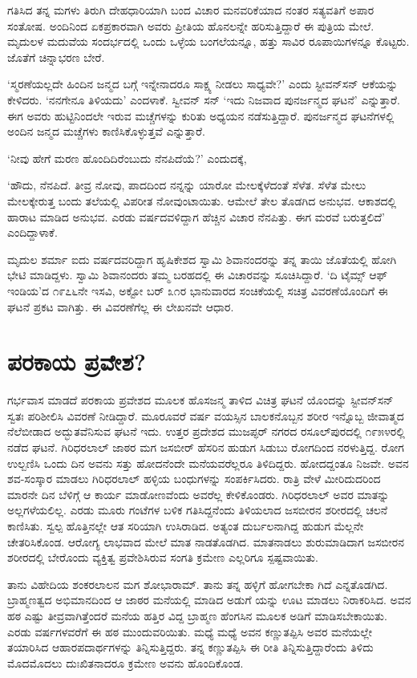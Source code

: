 ಗತಿಸಿದ ತನ್ನ ಮಗಳು ತಿರುಗಿ ದೇಹಧಾರಿಯಾಗಿ ಬಂದ ವಿಚಾರ ಮನವರಿಕೆಯಾದ ನಂತರ ಸತ್ಯವತಿಗೆ ಅಪಾರ ಸಂತೋಷ. ಅಂದಿನಿಂದ ಏಕಪ್ರಕಾರವಾಗಿ ಅವರು ಪ್ರೀತಿಯ ಹೊನಲನ್ನೇ ಹರಿಸುತ್ತಿದ್ದಾರೆ ಈ ಪುತ್ರಿಯ ಮೇಲೆ. ಮೃದುಲಳ ಮದುವೆಯ ಸಂದರ್ಭದಲ್ಲಿ ಒಂದು ಒಳ್ಳೆಯ ಬಂಗಲೆಯನ್ನೂ, ಹತ್ತು ಸಾವಿರ ರೂಪಾಯಿಗಳನ್ನೂ ಕೊಟ್ಟರು. ಜೊತೆಗೆ ಚಿನ್ನಾಭರಣ ಬೇರೆ.

‘ಸ್ಮರಣೆಯಲ್ಲದೇ ಹಿಂದಿನ ಜನ್ಮದ ಬಗ್ಗೆ ಇನ್ನೇನಾದರೂ ಸಾಕ್ಷ್ಯ ನೀಡಲು ಸಾಧ್ಯವೇ?’ ಎಂದು ಸ್ಟೀವನ್​ಸನ್ ಆಕೆಯನ್ನು ಕೇಳಿದರು. ‘ನನಗೇನೂ ತಿಳಿಯದು’ ಎಂದಳಾಕೆ. ಸ್ವೀವನ್ ಸನ್ ‘ಇದು ನಿಜವಾದ ಪುನರ್ಜನ್ಮದ ಘಟನೆ’ ಎನ್ನುತ್ತಾರೆ. ಈಗ ಅವರು ಹುಟ್ಟಿನಿಂದಲೇ ಇರುವ ಮಚ್ಚೆಗಳನ್ನು ಕುರಿತು ಅಧ್ಯಯನ ನಡೆಸುತ್ತಿದ್ದಾರೆ. ಪುನರ್ಜನ್ಮದ ಘಟನೆಗಳಲ್ಲಿ ಅಂದಿನ ಜನ್ಮದ ಮಚ್ಚೆಗಳು ಕಾಣಿಸಿಕೊಳ್ಳುತ್ತವೆ ಎನ್ನುತ್ತಾರೆ.

‘ನೀವು ಹೇಗೆ ಮರಣ ಹೊಂದಿದಿರೆಂಬುದು ನೆನಪಿದೆಯೆ?’ ಎಂದುದಕ್ಕೆ,

‘ಹೌದು, ನೆನಪಿದೆ. ತೀವ್ರ ನೋವು, ಪಾದದಿಂದ ನನ್ನನ್ನು ಯಾರೋ ಮೇಲಕ್ಕೆಳೆದಂತೆ ಸೆಳೆತ. ಸೆಳೆತ ಮೇಲು ಮೇಲಕ್ಕೇರುತ್ತ ಬಂದು ತಲೆಯಲ್ಲಿ ವಿಪರೀತ ನೋವುಂಟಾಯಿತು. ಆಮೇಲೆ ತೇಲ ತೊಡಗಿದ ಅನುಭವ. ಆಕಾಶದಲ್ಲಿ ಹಾರಾಟ ಮಾಡಿದ ಅನುಭವ. ಎರಡು ವರ್ಷದವಳಿದ್ದಾಗ ಹೆಚ್ಚಿನ ವಿಚಾರ ನೆನಪಿತ್ತು. ಈಗ ಮರವೆ ಬರುತ್ತಲಿದೆ’ ಎಂದಿದ್ದಾಳಾಕೆ.

ಮೃದುಲ ಶರ್ಮಾ ಐದು ವರ್ಷದವರಿದ್ದಾಗ ಹೃಷಿಕೇಶದ ಸ್ವಾಮಿ ಶಿವಾನಂದರನ್ನು ತನ್ನ ತಾಯಿ ಜೊತೆಯಲ್ಲಿ ಹೋಗಿ ಭೇಟಿ ಮಾಡಿದ್ದಳು. ಸ್ವಾಮಿ ಶಿವಾನಂದರು ತಮ್ಮ ಬರಹದಲ್ಲಿ ಈ ವಿಚಾರವನ್ನು ಸೂಚಿಸಿದ್ದಾರೆ. ‘ದಿ ಟೈಮ್ಸ್ ಆಫ್ ಇಂಡಿಯ’ದ ೧೯೭೬ನೇ ಇಸವಿ, ಅಕ್ಟೋ ಬರ್ ೩೧ರ ಭಾನುವಾರದ ಸಂಚಿಕೆಯಲ್ಲಿ ಸಚಿತ್ರ ವಿವರಣೆಯೊಂದಿಗೆ ಈ ಘಟನೆ ಪ್ರಕಟ ವಾಗಿತ್ತು. ಈ ವಿವರಣೆಗೆಲ್ಲ ಈ ಲೇಖನವೇ ಆಧಾರ.


\section{ಪರಕಾಯ ಪ್ರವೇಶ?}

ಗರ್ಭವಾಸ ಮಾಡದೆ ಪರಕಾಯ ಪ್ರವೇಶದ ಮೂಲಕ ಹೊಸಜನ್ಮ ತಾಳಿದ ವಿಚಿತ್ರ ಘಟನೆ ಯೊಂದನ್ನು ಸ್ಟೀವನ್​ಸನ್ ಸ್ವತಃ ಪರಿಶೀಲಿಸಿ ವಿವರಣೆ ನೀಡಿದ್ದಾರೆ. ಮೂರೂವರೆ ವರ್ಷ ವಯಸ್ಸಿನ ಬಾಲಕನೊಬ್ಬನ ಶರೀರ ಇನ್ನೊಬ್ಬ ಜೀವಾತ್ಮದ ನೆಲೆಬೀಡಾದ ಅದ್ಭುತವೆನಿಸುವ ಘಟನೆ ಇದು. ಉತ್ತರ ಪ್ರದೇಶದ ಮುಜಪ್ಫರ್ ನಗರದ ರಸೂಲ್​ಪುರದಲ್ಲಿ ೧೯೫೪ರಲ್ಲಿ ನಡೆದ ಘಟನೆ. ಗಿರಿಧರಲಾಲ್ ಜಾಠರ ಮಗ ಜಸಬೀರ್ ಹೆಸರಿನ ಹುಡುಗ ಸಿಡುಬು ರೋಗದಿಂದ ನರಳುತ್ತಿದ್ದ. ರೋಗ ಉಲ್ಬಣಿಸಿ ಒಂದು ದಿನ ಅವನು ಸತ್ತು ಹೋದನೆಂದೇ ಮನೆಯವರೆಲ್ಲರೂ ತಿಳಿದಿದ್ದರು. ಹೋದದ್ದಂತೂ ನಿಜವೇ. ಅವನ ಶವ-ಸಂಸ್ಕಾರ ಮಾಡಲು ಗಿರಿಧರಲಾಲ್ ಹಳ್ಳಿಯ ಬಂಧುಗಳನ್ನು ಸಂಪರ್ಕಿಸಿದರು. ರಾತ್ರಿ ವೇಳೆ ಮೀರಿದುದರಿಂದ ಮಾರನೇ ದಿನ ಬೆಳಿಗ್ಗೆ ಆ ಕಾರ್ಯ ಮಾಡೋಣವೆಂದು ಅವರೆಲ್ಲ ಕೇಳಿಕೊಂಡರು. ಗಿರಿಧರಲಾಲ್ ಅವರ ಮಾತನ್ನು ಅಲ್ಲಗಳೆಯಲಿಲ್ಲ. ಎರಡು ಮೂರು ಗಂಟೆಗಳ ಬಳಿಕ ಗತಿಸಿದ್ದನೆಂದು ತಿಳಿಯಲಾದ ಜಸಬೀರನ ಶರೀರದಲ್ಲಿ ಚಲನೆ ಕಾಣಿಸಿತು. ಸ್ವಲ್ಪ ಹೊತ್ತಿನಲ್ಲೇ ಆತ ಸರಿಯಾಗಿ ಉಸಿರಾಡಿದ. ಅತ್ಯಂತ ದುರ್ಬಲನಾಗಿದ್ದ ಹುಡುಗ ಮೆಲ್ಲನೇ ಚೇತರಿಸಿಕೊಂಡ. ಆರೋಗ್ಯ ಲಾಭವಾದ ಮೇಲೆ ಮಾತ ನಾಡತೊಡಗಿದ. ಮಾತನಾಡಲು ಶುರುಮಾಡಿದಾಗ ಜಸಬೀರನ ಶರೀರದಲ್ಲಿ ಬೇರೊಂದು ವ್ಯಕ್ತಿತ್ವ ಪ್ರವೇಶಿಸಿರುವ ಸಂಗತಿ ಕ್ರಮೇಣ ಎಲ್ಲರಿಗೂ ಸ್ಪಷ್ಟವಾಯಿತು.

ತಾನು ವಿಹೇದಿಯ ಶಂಕರಲಾಲನ ಮಗ ಶೋಭಾರಾಮ್. ತಾನು ತನ್ನ ಹಳ್ಳಿಗೆ ಹೋಗಬೇಕಾ ಗಿದೆ ಎನ್ನತೊಡಗಿದ. ಬ್ರಾಹ್ಮಣತ್ವದ ಅಭಿಮಾನದಿಂದ ಆ ಜಾಠರ ಮನೆಯಲ್ಲಿ ಮಾಡಿದ ಅಡುಗೆ ಯನ್ನು ಊಟ ಮಾಡಲು ನಿರಾಕರಿಸಿದ. ಅವನ ಹಠ ಎಷ್ಟು ತೀವ್ರವಾಗಿತ್ತೆಂದರೆ ಮನೆಯ ಹತ್ತಿರ ವಿದ್ದ ಬ್ರಾಹ್ಮಣ ಹೆಂಗಸಿನ ಮೂಲಕ ಅಡಿಗೆ ಮಾಡಿಸಬೇಕಾಯಿತು. ಎರಡು ವರ್ಷಗಳವರೆಗೆ ಈ ಹಠ ಮುಂದುವರಿಯಿತು. ಮಧ್ಯೆ ಮಧ್ಯೆ ಅವನ ಕಣ್ಣುತಪ್ಪಿಸಿ ಅವರ ಮನೆಯಲ್ಲೇ ತಯಾರಿಸಿದ ಆಹಾರಪದಾರ್ಥಗಳನ್ನು ತಿನ್ನಿಸುತ್ತಿದ್ದರು. ತನ್ನ ಕಣ್ಣುತಪ್ಪಿಸಿ ಈ ರೀತಿ ತಿನ್ನಿಸುತ್ತಿದ್ದಾರೆಂದು ತಿಳಿದು ಮೊದಮೊದಲು ದುಃಖಿತನಾದರೂ ಕ್ರಮೇಣ ಅವನು ಹೊಂದಿಕೊಂಡ.


